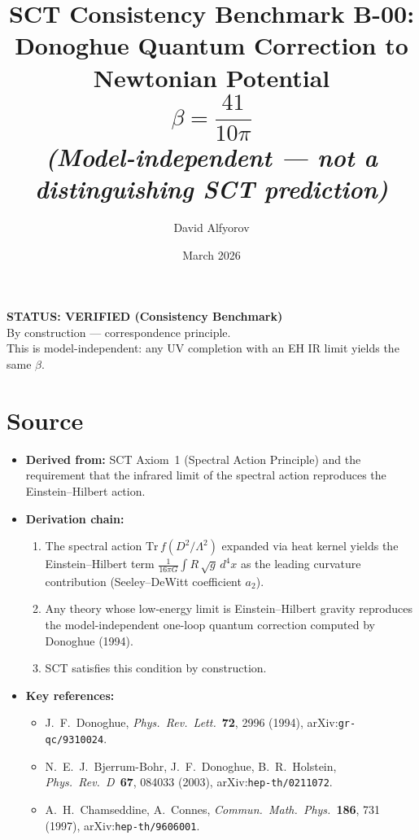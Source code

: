 \documentclass[11pt,a4paper]{article}
\title{%
  \textbf{SCT Consistency Benchmark B-00:}\\[6pt]
  \Large Donoghue Quantum Correction to Newtonian Potential\\[4pt]
  \large $\beta = \dfrac{41}{10\pi}$\\[4pt]
  \normalsize\textit{(Model-independent --- not a distinguishing SCT prediction)}
}
\author{David Alfyorov}
\date{March 2026}
\begin{document}
\maketitle


\begin{center}
\end{center}

\begin{center}
  \colorbox{verified!15}{\parbox{0.7\textwidth}{\centering
    \textbf{\color{verified} STATUS: VERIFIED (Consistency Benchmark)}\\[2pt]
    \small By construction --- correspondence principle.\\
    \small This is model-independent: any UV completion with an EH IR limit yields the same $\beta$.
  }}
\end{center}

\vspace{1em}

\section{Source}

\begin{itemize}[leftmargin=2em]
  \item \textbf{Derived from:} SCT Axiom~1 (Spectral Action Principle) and the requirement that the infrared limit of the spectral action reproduces the Einstein--Hilbert action.
  \item \textbf{Derivation chain:}
    \begin{enumerate}
      \item The spectral action $\mathrm{Tr}\,f(D^2/\Lambda^2)$ expanded via heat kernel yields the Einstein--Hilbert term $\frac{1}{16\pi G}\int R\,\sqrt{g}\,d^4x$ as the leading curvature contribution (Seeley--DeWitt coefficient $a_2$).
      \item Any theory whose low-energy limit is Einstein--Hilbert gravity reproduces the model-independent one-loop quantum correction computed by Donoghue (1994).
      \item SCT satisfies this condition by construction.
    \end{enumerate}
  \item \textbf{Key references:}
    \begin{itemize}
      \item J.~F.~Donoghue, \textit{Phys.\ Rev.\ Lett.}\ \textbf{72}, 2996 (1994), arXiv:\texttt{gr-qc/9310024}.
      \item N.~E.~J.~Bjerrum-Bohr, J.~F.~Donoghue, B.~R.~Holstein, \textit{Phys.\ Rev.\ D}~\textbf{67}, 084033 (2003), arXiv:\texttt{hep-th/0211072}.
      \item A.~H.~Chamseddine, A.~Connes, \textit{Commun.\ Math.\ Phys.}\ \textbf{186}, 731 (1997), arXiv:\texttt{hep-th/9606001}.
    \end{itemize}
\end{itemize}
\end{document}
